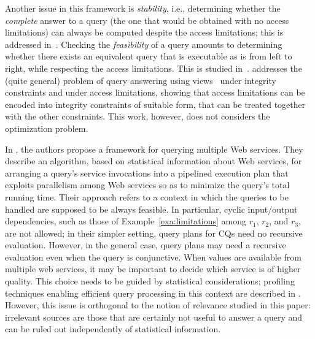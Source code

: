 

Another issue in this framework is \emph{stability}, i.e., determining whether
the \emph{complete} answer to a query (the one that would be obtained with no
access limitations) can always be computed despite the access limitations; this
is addressed in~\cite{Li03}.
%
Checking the \emph{feasibility} of a query amounts to determining whether there
exists an equivalent query that is executable as is from left to right, while
respecting the access limitations.  This is studied
in~\cite{NaLu04,LuNa04a,YaKC06}.
%
\cite{Deutsch:2007lr} addresses the (quite general) problem of query answering using
views~\cite{Hale01} under integrity constraints and under access limitations,
showing that access limitations can be encoded into integrity constraints of
suitable form, that can be treated together with the other constraints.  This
work, however, does not considers the optimization problem.

In \cite{Srivastava:2006fk}, the authors propose a framework for querying
multiple Web services. They describe an algorithm, based on statistical
information about Web services, for arranging a query's service invocations
into a pipelined execution plan that exploits parallelism among Web services so
as to minimize the query's total running time.  Their approach refers to a
context in which the queries to be handled are supposed to be always
feasible. In particular, cyclic input/output dependencies, such as those of
Example~\ref{exa:limitations} among $r_1$, $r_2$, and $r_3$, are not allowed;
in their simpler setting, query plans for CQs need no recursive evaluation.
However, in the general case, query plans may need a recursive evaluation even
when the query is conjunctive.
%
When values are available from multiple web services, it may be important to
decide which service is of higher quality.  This choice needs to be guided by
statistical considerations; profiling techniques enabling efficient query
processing in this context are described in \cite{SrivastavaPhDThesis}.
However, this issue is orthogonal to the notion of relevance studied in this
paper: irrelevant sources are those that are certainly not useful to answer a
query and can be ruled out independently of statistical information.

